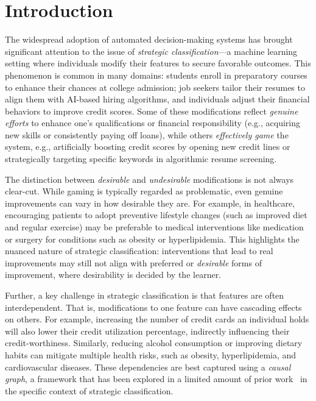 \section{Introduction}\label{sec:intro}

The widespread adoption of automated decision-making systems has brought significant attention to the issue of \emph{strategic classification}---a machine learning setting where individuals modify their features to secure favorable outcomes. This phenomenon is common in many domains: students enroll in preparatory courses to enhance their chances at college admission; job seekers tailor their resumes to align them with AI-based hiring algorithms, and individuals adjust their financial behaviors to improve credit scores. Some of these modifications reflect \emph{genuine efforts} to enhance one's qualifications or financial responsibility (e.g., acquiring new skills or consistently paying off loans), while others \emph{effectively game} the system, e.g., artificially boosting credit scores by opening new credit lines or strategically targeting specific keywords in algorithmic resume screening.

The distinction between \emph{desirable} and \emph{undesirable} modifications is not always clear-cut. While gaming is typically regarded as problematic, even genuine improvements can vary in how desirable they are. For example, in healthcare, encouraging patients to adopt preventive lifestyle changes (such as improved diet and regular exercise) may be preferable to medical interventions like medication or surgery for conditions such as obesity or hyperlipidemia. This highlights the nuanced nature of strategic classification: interventions that lead to real improvements may still not align with preferred or \emph{desirable} forms of improvement, where desirability is decided by the learner.

Further, a key challenge in strategic classification is that features are often interdependent. That is, modifications to one feature can have cascading effects on others. For example, increasing the number of credit cards an individual holds will also lower their credit utilization percentage, indirectly influencing their credit-worthiness. Similarly, reducing alcohol consumption or improving dietary habits can mitigate multiple health risks, such as obesity, hyperlipidemia, and cardiovascular diseases. These dependencies are best captured using a \emph{causal graph}, a framework that has been explored in a limited amount of prior work~\cite{kleinberg2019classifiers,miller2020strategic,shavit2020incentives,bechavod2022gaming} in the specific context of strategic classification. 

